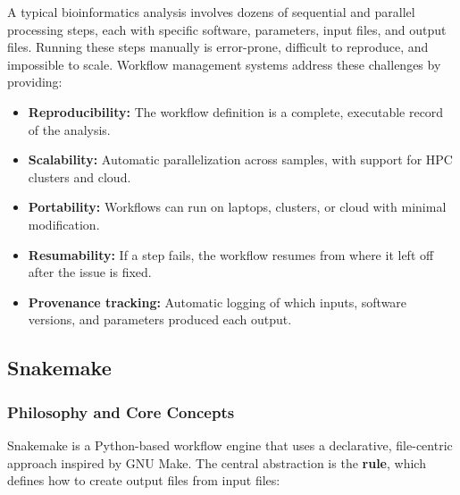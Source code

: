 A typical bioinformatics analysis involves dozens of sequential and parallel processing steps, each with specific software, parameters, input files, and output files. Running these steps manually is error-prone, difficult to reproduce, and impossible to scale. Workflow management systems address these challenges by providing:

\begin{itemize}[itemsep=2pt]
  \item \textbf{Reproducibility:} The workflow definition is a complete, executable record of the analysis.
  \item \textbf{Scalability:} Automatic parallelization across samples, with support for HPC clusters and cloud.
  \item \textbf{Portability:} Workflows can run on laptops, clusters, or cloud with minimal modification.
  \item \textbf{Resumability:} If a step fails, the workflow resumes from where it left off after the issue is fixed.
  \item \textbf{Provenance tracking:} Automatic logging of which inputs, software versions, and parameters produced each output.
\end{itemize}

\subsection{Snakemake}
\label{subsec:bioinf:snakemake}

\subsubsection{Philosophy and Core Concepts}

Snakemake is a Python-based workflow engine that uses a declarative, file-centric approach inspired by GNU Make. The central abstraction is the \textbf{rule}, which defines how to create output files from input files:

